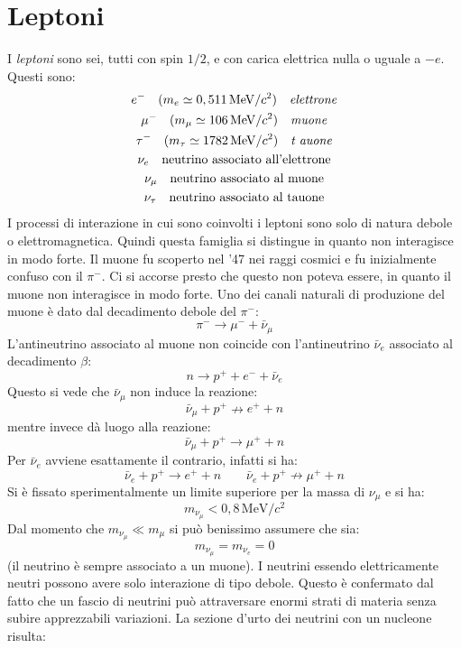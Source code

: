 \section{Leptoni}
 I \textit{leptoni} sono sei, tutti con spin $1/2$, e con 
carica elettrica nulla o uguale a
$-e$. Questi sono:
\begin{gather}
e^-\quad(m_e\simeq0,511\,\si{\mega\electronvolt}/c^2)\quad
\text{\textit{elettrone}}\\
\mu^-\quad(m_{\mu}\simeq
106\,\si{\mega\electronvolt}/c^2)\quad\text{\textit{muone}}\\
\tau^-\quad(m_{\tau}\simeq1782\,\si{\mega\electronvolt}/c^2)\quad\text{\textit{t
auone}}\\
\nu_e\quad\text{neutrino associato all'elettrone}\\
\nu_{\mu}\quad\text{neutrino associato al muone}\\
\nu_{\tau}\quad\text{neutrino associato al tauone}
\end{gather}
I processi di interazione in cui sono coinvolti i leptoni sono solo di natura 
debole o elettromagnetica.
Quindi questa famiglia si distingue in quanto non interagisce in modo forte. Il 
muone fu scoperto nel '47 nei
raggi cosmici e fu inizialmente confuso con il $\pi^-$.
Ci si accorse presto che questo non poteva essere, in quanto il muone non 
interagisce in modo forte. Uno dei
canali naturali di produzione del muone è dato dal decadimento debole del 
$\pi^-$:
\[
\pi^-\rightarrow \mu^-+\bar{\nu}_{\mu}
\]
L'antineutrino associato al muone non coincide con l'antineutrino $\bar{\nu}_e$ 
associato al decadimento $\beta$:
\[
n\rightarrow p^++e^-+\bar{\nu}_e
\]
Questo si vede che $\bar{\nu}_{\mu}$ non induce la reazione:
\[
\bar{\nu}_{\mu}+p^+\nrightarrow e^++n
\]
mentre invece dà luogo alla reazione:
\[
\bar{\nu}_{\mu}+p^+\rightarrow\mu^++n
\]
Per $\bar{\nu}_e$ avviene esattamente il contrario, infatti si ha:
\[
\bar{\nu}_e+p^+\rightarrow e^++n\qquad\bar{\nu}_e+p^+\nrightarrow\mu^++n
\]
Si è fissato sperimentalmente un limite superiore per la massa di $\nu_{\mu}$ 
e si ha:
\[
m_{\nu_{\mu}}<0,8\,\si{\mega\electronvolt}/c^2
\]
Dal momento che $m_{\nu_{\mu}}\ll m_{\mu}$ si può benissimo assumere che sia:
\[
m_{\nu_{\mu}}=m_{\nu_e}=0
\]
(il neutrino è sempre associato a un muone). I neutrini essendo elettricamente 
neutri possono avere solo
interazione di tipo debole.
Questo è confermato dal fatto che un fascio di neutrini può attraversare 
enormi strati di materia senza
subire apprezzabili variazioni.
La sezione d'urto dei neutrini con un nucleone risulta:
